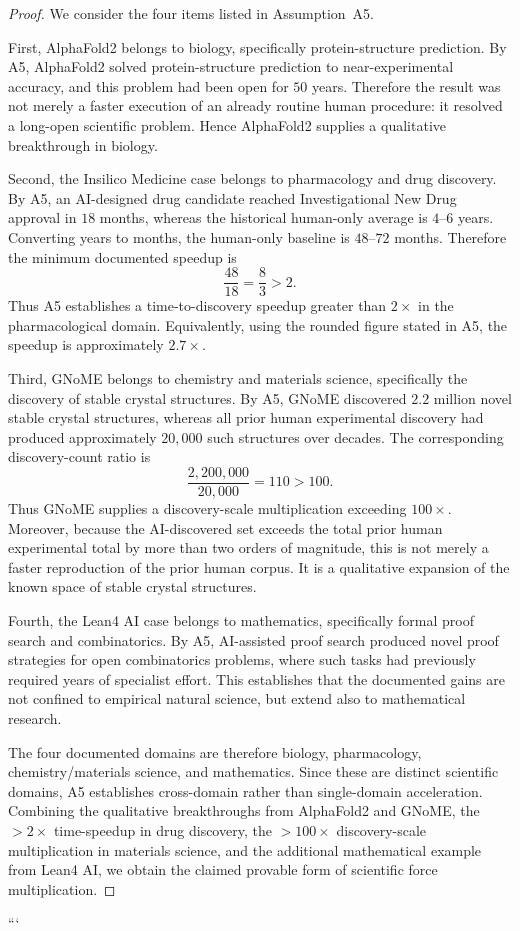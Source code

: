 \begin{proof}
  We consider the four items listed in Assumption~A5.

  First, AlphaFold2 belongs to biology, specifically protein-structure
  prediction.  By A5, AlphaFold2 solved protein-structure prediction to
  near-experimental accuracy, and this problem had been open for $50$ years.
  Therefore the result was not merely a faster execution of an already
  routine human procedure: it resolved a long-open scientific problem.
  Hence AlphaFold2 supplies a qualitative breakthrough in biology.

  Second, the Insilico Medicine case belongs to pharmacology and drug
  discovery.  By A5, an AI-designed drug candidate reached Investigational
  New Drug approval in $18$ months, whereas the historical human-only
  average is $4$--$6$ years.  Converting years to months, the human-only
  baseline is $48$--$72$ months.  Therefore the minimum documented speedup is
  \[
    \frac{48}{18}=\frac{8}{3}>2.
  \]
  Thus A5 establishes a time-to-discovery speedup greater than $2\times$ in
  the pharmacological domain.  Equivalently, using the rounded figure stated
  in A5, the speedup is approximately $2.7\times$.

  Third, GNoME belongs to chemistry and materials science, specifically the
  discovery of stable crystal structures.  By A5, GNoME discovered
  $2.2$ million novel stable crystal structures, whereas all prior human
  experimental discovery had produced approximately $20{,}000$ such
  structures over decades.  The corresponding discovery-count ratio is
  \[
    \frac{2{,}200{,}000}{20{,}000}=110>100.
  \]
  Thus GNoME supplies a discovery-scale multiplication exceeding
  $100\times$.  Moreover, because the AI-discovered set exceeds the total
  prior human experimental total by more than two orders of magnitude, this
  is not merely a faster reproduction of the prior human corpus.  It is a
  qualitative expansion of the known space of stable crystal structures.

  Fourth, the Lean4 AI case belongs to mathematics, specifically formal proof
  search and combinatorics.  By A5, AI-assisted proof search produced novel
  proof strategies for open combinatorics problems, where such tasks had
  previously required years of specialist effort.  This establishes that the
  documented gains are not confined to empirical natural science, but extend
  also to mathematical research.

  The four documented domains are therefore biology, pharmacology,
  chemistry/materials science, and mathematics.  Since these are distinct
  scientific domains, A5 establishes cross-domain rather than single-domain
  acceleration.  Combining the qualitative breakthroughs from AlphaFold2 and
  GNoME, the $>2\times$ time-speedup in drug discovery, the $>100\times$
  discovery-scale multiplication in materials science, and the additional
  mathematical example from Lean4 AI, we obtain the claimed provable form of
  scientific force multiplication.
\end{proof}
```

